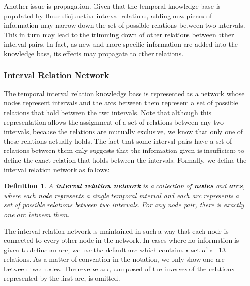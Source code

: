 \documentclass[11pt]{report}
\newtheorem{vdefinition}{Definition}[chapter]
\begin{document}
        Another issue is propagation. Given that the temporal knowledge base
        is populated by these disjunctive interval relations, adding new
        pieces of information may narrow down the set of possible relations
        between two intervals. This in turn may lead to the trimming down of
        other relations between other interval pairs. In fact, as new and more
        specific information are added into the knowledge base, its effects may
        propagate to other relations.

        \subsubsection{Interval Relation Network}

          The temporal interval relation knowledge base is represented as a
          network whose nodes represent intervals and the arcs between them
          represent a set of possible relations that hold between the two
          intervals. Note that although this representation allows the
          assignment of a set of relations between any two intervals, because
          the relations are mutually exclusive, we know that only one of these
          relations actually holds. The fact that some interval pairs have a
          set of relations between them only suggests that the information
          given is insufficient to define the exact relation that holds
          between the intervals. Formally, we define the interval relation
          network as follows:

          \begin{vdefinition}
            \label{defn-tempo-netwk}
            A {\bf interval relation network} is a collection of {\bf nodes}
            and {\bf arcs}, where each node represents a single temporal
            interval and each arc represents a set of possible relations
            between two intervals. For any node pair, there is exactly one arc
            between them.
          \end{vdefinition}

          The interval relation network is maintained in such a way that each
          node is connected to every other node in the network. In cases where
          no information is given to define an arc, we use the default arc
          which  contains a set of all 13 relations. As a matter of convention
          in the notation, we only show one arc between two nodes. The reverse
          arc, composed of the inverses of the relations represented by the
          first arc, is omitted.
\end{document}
